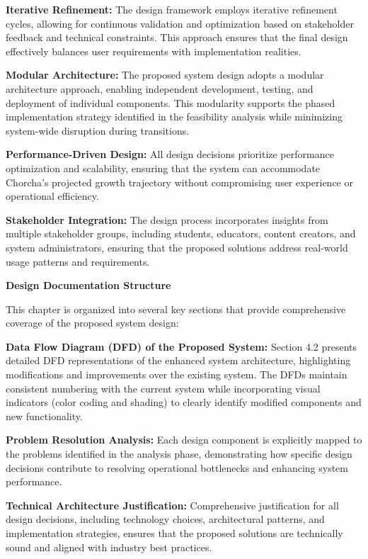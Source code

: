 \documentclass[12pt,a4paper,oneside]{book}
\begin{document}
\textbf{Iterative Refinement:} The design framework employs iterative refinement cycles, allowing for continuous validation and optimization based on stakeholder feedback and technical constraints. This approach ensures that the final design effectively balances user requirements with implementation realities.

\textbf{Modular Architecture:} The proposed system design adopts a modular architecture approach, enabling independent development, testing, and deployment of individual components. This modularity supports the phased implementation strategy identified in the feasibility analysis while minimizing system-wide disruption during transitions.

\textbf{Performance-Driven Design:} All design decisions prioritize performance optimization and scalability, ensuring that the system can accommodate Chorcha's projected growth trajectory without compromising user experience or operational efficiency.

\textbf{Stakeholder Integration:} The design process incorporates insights from multiple stakeholder groups, including students, educators, content creators, and system administrators, ensuring that the proposed solutions address real-world usage patterns and requirements.

\textbf{Design Documentation Structure}

This chapter is organized into several key sections that provide comprehensive coverage of the proposed system design:

\textbf{Data Flow Diagram (DFD) of the Proposed System:} Section 4.2 presents detailed DFD representations of the enhanced system architecture, highlighting modifications and improvements over the existing system. The DFDs maintain consistent numbering with the current system while incorporating visual indicators (color coding and shading) to clearly identify modified components and new functionality.

\textbf{Problem Resolution Analysis:} Each design component is explicitly mapped to the problems identified in the analysis phase, demonstrating how specific design decisions contribute to resolving operational bottlenecks and enhancing system performance.

\textbf{Technical Architecture Justification:} Comprehensive justification for all design decisions, including technology choices, architectural patterns, and implementation strategies, ensures that the proposed solutions are technically sound and aligned with industry best practices.
\end{document}
